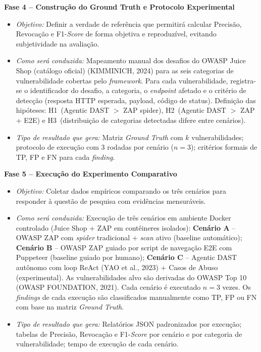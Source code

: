 \documentclass[12pt, a4paper]{article}
\begin{document}
\begin{itemize}
  \vspace{0.4em}
  \textbf{Fase 4 -- Construção do Ground Truth e Protocolo Experimental}
  \begin{itemize}
    \item \textit{Objetivo:} Definir a verdade de referência que permitirá calcular Precisão, Revocação e F1-\textit{Score} de forma objetiva e reproduzível, evitando subjetividade na avaliação.
    \item \textit{Como será conduzida:} Mapeamento manual dos desafios do OWASP Juice Shop (catálogo oficial) (KIMMINICH, 2024) para as seis categorias de vulnerabilidade cobertas pelo \textit{framework}. Para cada vulnerabilidade, registra-se o identificador do desafio, a categoria, o \textit{endpoint} afetado e o critério de detecção (resposta HTTP esperada, payload, código de status). Definição das hipóteses: H1~(Agentic DAST $>$ ZAP spider), H2~(Agentic DAST $>$ ZAP + E2E) e H3~(distribuição de categorias detectadas difere entre cenários).
    \item \textit{Tipo de resultado que gera:} Matriz \textit{Ground Truth} com $k$ vulnerabilidades; protocolo de execução com 3 rodadas por cenário ($n = 3$); critérios formais de TP, FP e FN para cada \textit{finding}.
  \end{itemize}

  \vspace{0.4em}
  \textbf{Fase 5 -- Execução do Experimento Comparativo}
  \begin{itemize}
    \item \textit{Objetivo:} Coletar dados empíricos comparando os três cenários para responder à questão de pesquisa com evidências mensuráveis.
    \item \textit{Como será conduzida:} Execução de três cenários em ambiente Docker controlado (Juice Shop + ZAP em contêineres isolados): \textbf{Cenário A} -- OWASP ZAP com \textit{spider} tradicional + \textit{scan} ativo (baseline automático); \textbf{Cenário B} -- OWASP ZAP guiado por script de navegação E2E com Puppeteer (baseline guiado por humano); \textbf{Cenário C} -- Agentic DAST autônomo com loop ReAct (YAO et al., 2023) + Casos de Abuso (experimental). As vulnerabilidades alvo são derivadas do OWASP Top 10 (OWASP FOUNDATION, 2021). Cada cenário é executado $n = 3$ vezes. Os \textit{findings} de cada execução são classificados manualmente como TP, FP ou FN com base na matriz \textit{Ground Truth}.
    \item \textit{Tipo de resultado que gera:} Relatórios JSON padronizados por execução; tabelas de Precisão, Revocação e F1-\textit{Score} por cenário e por categoria de vulnerabilidade; tempo de execução de cada cenário.
  \end{itemize}


\end{itemize}
\end{document}
